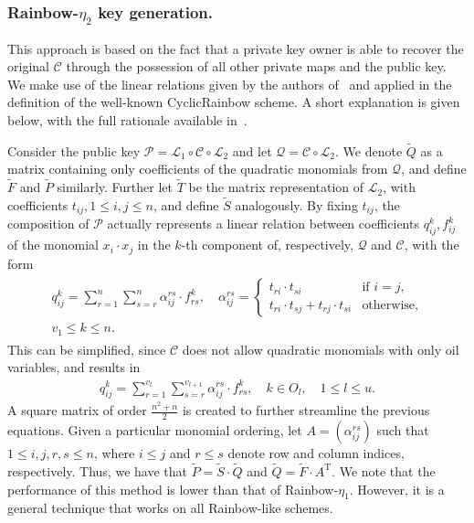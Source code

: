 \documentclass[draft, 12pt, a4paper, oneside]{memoir}
\theoremstyle{definition}
\begin{document}
\subsubsection{Rainbow-$\eta_{2}$ key generation.}

This approach is based on the fact that a private key owner is able to recover
the original $\mathcal{C}$ through the possession of all other private maps and
the public key. We make use of the linear relations given by the authors
of~\cite{Petzoldt:201006} and applied in the definition of the
well-known CyclicRainbow scheme. A short explanation is given below, with the
full rationale available in~\cite[Chapter 7]{Petzoldt:201307}.

Consider the public key
$\mathcal{P} = \mathcal{L}_{1} \circ \mathcal{C} \circ \mathcal{L}_{2}$ and let
$\mathcal{Q} = \mathcal{C} \circ \mathcal{L}_{2}$. We denote $\widetilde{Q}$ as a
matrix containing only coefficients of the quadratic monomials from
$\mathcal{Q}$, and define $\widetilde{F}$ and $\widetilde{P}$ similarly.
Further let $\widetilde{T}$ be the matrix representation of $\mathcal{L}_{2}$, with
coefficients $t_{ij}, 1 \leq i, j \leq n$, and define $\widetilde{S}$
analogously. By fixing $t_{ij}$, the composition of $\mathcal{P}$ actually
represents a linear relation between coefficients $q_{ij}^{k}, f_{ij}^{k}$ of
the monomial $x_{i} \cdot x_{j}$ in the $k$-th component of, respectively,
$\mathcal{Q}$ and $\mathcal{C}$, with the form
\begin{align}
  \begin{split}
    q_{ij}^{k} = \sum_{r = 1}^{n} \sum_{s = r}^{n}
      \alpha_{ij}^{rs} \cdot f_{rs}^{k}, \quad
      \alpha_{ij}^{rs} = \begin{cases}
        t_{ri} \cdot t_{si}                         & \text{if } i = j, \\
        t_{ri} \cdot t_{sj} + t_{rj} \cdot t_{si}   & \text{otherwise},
      \end{cases} \\
      v_{1} \leq k \leq n.
  \end{split}
\end{align}
This can be simplified, since $\mathcal{C}$ does not allow quadratic monomials
with only oil variables, and results in
\begin{align}
  q_{ij}^{k} = \sum_{r = 1}^{v_{l}} \sum_{s = r}^{v_{l + 1}}
    \alpha_{ij}^{rs} \cdot f_{rs}^{k},
      \quad k \in O_{l}, \quad 1 \leq l \leq u.
\end{align}
A square matrix of order $\frac{n^{2} + n}{2}$ is created to further streamline
the previous equations. Given a particular monomial ordering, let
$A = (\alpha_{ij}^{rs})$ such that $1 \leq i, j, r, s \leq n$, where
$i \leq j$ and $r \leq s$ denote row and column indices, respectively. Thus, we
have that $\widetilde{P} = \widetilde{S} \cdot \widetilde{Q}$ and
$\widetilde{Q} = \widetilde{F} \cdot A^{\text{T}}$. We note that the
performance of this method is lower than that of Rainbow-$\eta_{1}$. However,
it is a general technique that works on all Rainbow-like schemes.
\end{document}

